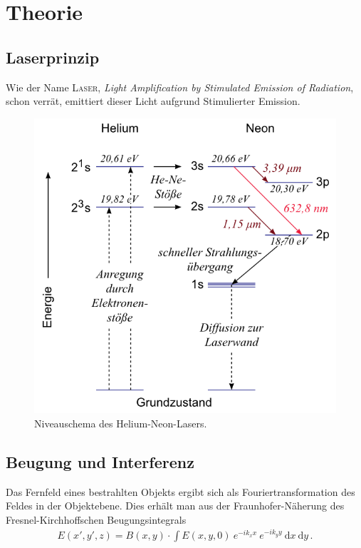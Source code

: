 \documentclass[12pt,a4paper,titlepage,headinclude,bibtotoc]{scrartcl}
\newcommand{\dif}{\ensuremath{\mathrm{d}}}
\begin{document}
\section{Theorie}
\label{sec:theorie}
\subsection{Laserprinzip}
Wie der Name \textsc{Laser}, \textit{Light Amplification by Stimulated Emission of Radiation}, schon verrät, emittiert dieser Licht aufgrund Stimulierter Emission.
\begin{figure}[!h]
	\centering
	\includegraphics[scale=0.7]{NiveauHeNe.png}
	\caption{Niveauschema des Helium-Neon-Lasers. \cite[Datum: 02.01.15]{LP21}}
\end{figure}


\subsection{Beugung und Interferenz}
Das Fernfeld eines bestrahlten Objekts ergibt sich als Fouriertransformation des Feldes in der Objektebene.
Dies erhält man aus der Fraunhofer-Näherung des Fresnel-Kirchhoffschen Beugungsintegrals
\begin{align}
	E(x',y',z)=B(x,y)\cdot \int E(x,y,0)~ e^{-ik_xx} ~ e^{-ik_yy} ~\dif x~ \dif y \,.
	\label{eq:Fraunhofer}
\end{align}
\end{document}
